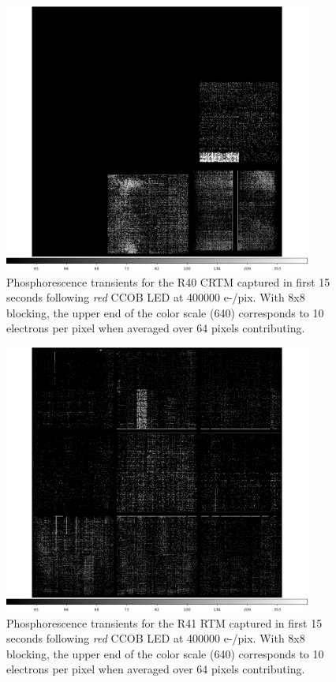 \begin{figure}[htbp]
\centering
\includegraphics[width=0.9\textwidth]{sections/figures/phosphorescence-survey/itl_fluor_R40_0-19_rb1_log.png}
\caption{Phosphorescence transients for the R40 CRTM captured in first 15 seconds following {\it red} CCOB LED at 400000 e-/pix. With 8x8 blocking, the upper end of the color scale (640) corresponds to 10 electrons per pixel when averaged over 64 pixels contributing.}
\label{fig:phos:R40}
\end{figure}

\begin{figure}[htbp]
\centering
\includegraphics[width=0.9\textwidth]{sections/figures/phosphorescence-survey/itl_fluor_R41_0-19_rb1_log.png}
\caption{Phosphorescence transients for the R41 RTM captured in first 15 seconds following {\it red} CCOB LED at 400000 e-/pix. With 8x8 blocking, the upper end of the color scale (640) corresponds to 10 electrons per pixel when averaged over 64 pixels contributing.}
\label{fig:phos:R41}
\end{figure}

